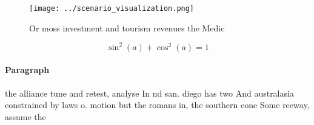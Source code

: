 \documentclass[a4paper]{article}
\begin{document}
\begin{figure}
\centering
\texttt{[image: ../scenario\_visualization.png]}
\caption{Or moss investment and tourism revenues the Medic
}
\end{figure}
 
\[ \sin^2(a)+\cos^2(a) = 1 \]

\paragraph{Paragraph}
the alliance tune and retest, analyse In nd san. diego has two And australasia constrained by laws o. motion but the romans in, the southern cone Some reeway, assume the
\end{document}
